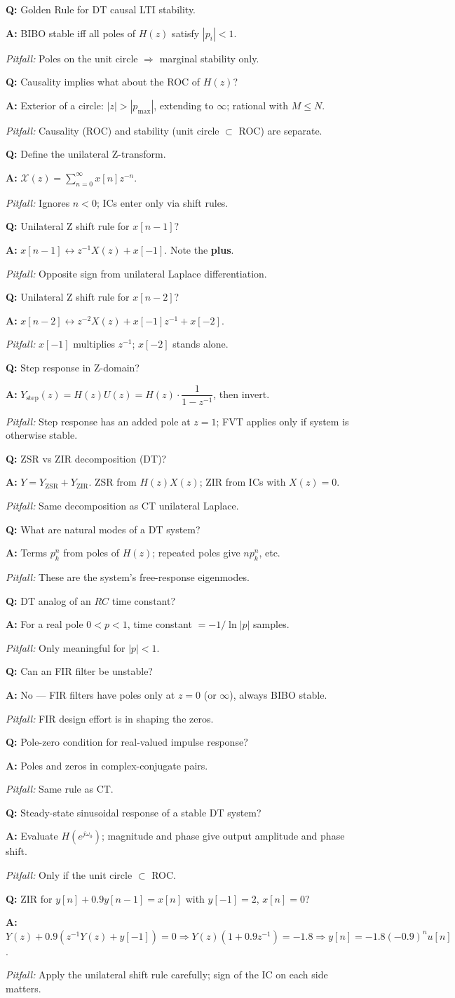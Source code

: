 \documentclass[11pt]{article}
\newcommand{\Q}[1]{\par\medskip\noindent\textbf{Q:} #1}
\newcommand{\A}[1]{\par\noindent\textbf{A:} #1}
\newcommand{\Pit}[1]{\par\noindent\textit{Pitfall:} #1}
\begin{document}
\Q{Golden Rule for DT causal LTI stability.}
\A{BIBO stable iff all poles of $H(z)$ satisfy $|p_i|<1$.}
\Pit{Poles on the unit circle $\Rightarrow$ marginal stability only.}

\Q{Causality implies what about the ROC of $H(z)$?}
\A{Exterior of a circle: $|z|>|p_{\max}|$, extending to $\infty$; rational with $M\le N$.}
\Pit{Causality (ROC) and stability (unit circle $\subset$ ROC) are separate.}

\Q{Define the unilateral Z-transform.}
\A{$\mathcal{X}(z) = \displaystyle\sum_{n=0}^{\infty} x[n]z^{-n}$.}
\Pit{Ignores $n<0$; ICs enter only via shift rules.}

\Q{Unilateral Z shift rule for $x[n-1]$?}
\A{$x[n-1]\leftrightarrow z^{-1}X(z) + x[-1]$. Note the \textbf{plus}.}
\Pit{Opposite sign from unilateral Laplace differentiation.}

\Q{Unilateral Z shift rule for $x[n-2]$?}
\A{$x[n-2]\leftrightarrow z^{-2}X(z) + x[-1]z^{-1} + x[-2]$.}
\Pit{$x[-1]$ multiplies $z^{-1}$; $x[-2]$ stands alone.}

\Q{Step response in Z-domain?}
\A{$Y_{\text{step}}(z) = H(z)U(z) = H(z)\cdot\dfrac{1}{1-z^{-1}}$, then invert.}
\Pit{Step response has an added pole at $z=1$; FVT applies only if system is otherwise stable.}

\Q{ZSR vs ZIR decomposition (DT)?}
\A{$Y = Y_{\text{ZSR}} + Y_{\text{ZIR}}$. ZSR from $H(z)X(z)$; ZIR from ICs with $X(z)=0$.}
\Pit{Same decomposition as CT unilateral Laplace.}

\Q{What are natural modes of a DT system?}
\A{Terms $p_k^n$ from poles of $H(z)$; repeated poles give $n p_k^n$, etc.}
\Pit{These are the system's free-response eigenmodes.}

\Q{DT analog of an $RC$ time constant?}
\A{For a real pole $0<p<1$, time constant $= -1/\ln|p|$ samples.}
\Pit{Only meaningful for $|p|<1$.}

\Q{Can an FIR filter be unstable?}
\A{No --- FIR filters have poles only at $z=0$ (or $\infty$), always BIBO stable.}
\Pit{FIR design effort is in shaping the zeros.}

\Q{Pole-zero condition for real-valued impulse response?}
\A{Poles and zeros in complex-conjugate pairs.}
\Pit{Same rule as CT.}

\Q{Steady-state sinusoidal response of a stable DT system?}
\A{Evaluate $H(e^{j\omega_0})$; magnitude and phase give output amplitude and phase shift.}
\Pit{Only if the unit circle $\subset$ ROC.}

\Q{ZIR for $y[n]+0.9y[n-1]=x[n]$ with $y[-1]=2$, $x[n]=0$?}
\A{$Y(z)+0.9(z^{-1}Y(z)+y[-1])=0\Rightarrow Y(z)(1+0.9z^{-1}) = -1.8\Rightarrow y[n] = -1.8(-0.9)^n u[n]$.}
\Pit{Apply the unilateral shift rule carefully; sign of the IC on each side matters.}
\end{document}
